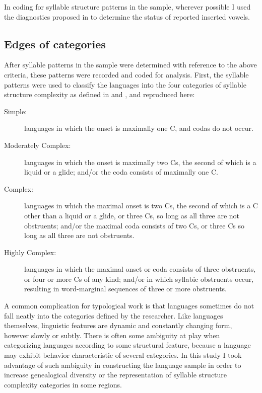   In coding for syllable structure patterns in the sample, wherever possible I used the diagnostics proposed in \citet{Hall2006} to determine the status of reported inserted vowels.

\subsection{Edges of categories}\label{sec:3.2.3}

  After syllable patterns in the sample were determined with reference to the above criteria, these patterns were recorded and coded for analysis. First, the syllable patterns were used to classify the languages into the four categories of syllable structure complexity as defined in \citet{Maddieson2013a} and , and reproduced here:

\begin{description}
\item[Simple:] languages in which the onset is maximally one C, and codas do not occur.
\item[Moderately Complex:] languages in which the onset is maximally two Cs, the second of which is a liquid or a glide; and/or the coda consists of maximally one C.
\item[Complex:] languages in which the maximal onset is two Cs, the second of which is a C other than a liquid or a glide, or three Cs, so long as all three are not obstruents; and/or the maximal coda consists of two Cs, or three Cs so long as all three are not obstruents.
\item[Highly Complex:] languages in which the maximal onset or coda consists of three obstruents, or four or more Cs of any kind; and/or in which syllabic obstruents occur, resulting in word-marginal sequences of three or more obstruents.
\end{description}

  A common complication for typological work is that languages sometimes do not fall neatly into the categories defined by the researcher. Like languages themselves, linguistic features are dynamic and constantly changing form, however slowly or subtly. There is often some ambiguity at play when categorizing languages according to some structural feature, because a language may exhibit behavior characteristic of several categories. In this study I took advantage of such ambiguity in constructing the language sample in order to increase genealogical diversity or the representation of syllable structure complexity categories in some regions.

